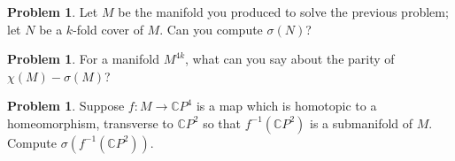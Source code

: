 \documentclass[12pt]{handout}
\theoremstyle{definition}
\newtheorem{problem}[theorem]{Problem}
\newcommand{\CP}{\mathbb{C}P}
\begin{document}
\vfill

\begin{problem}
  Let $M$ be the manifold you produced to solve the previous problem;
  let $N$ be a $k$-fold cover of $M$.  Can you compute $\sigma(N)$?
\end{problem}

\vfill

\begin{problem}
  For a manifold $M^{4k}$, what can you say about the parity of
  $\chi(M) - \sigma(M)$?
\end{problem}

\vfill

\begin{problem}
  Suppose $f : M \to \CP^4$ is a map which is homotopic to a
  homeomorphism, transverse to $\CP^{2}$ so that $f^{-1}(\CP^2)$ is a
  submanifold of $M$.  Compute $\sigma(f^{-1}(\CP^2))$.
\end{problem}

\vfill

\pagebreak
\null
\end{document}
